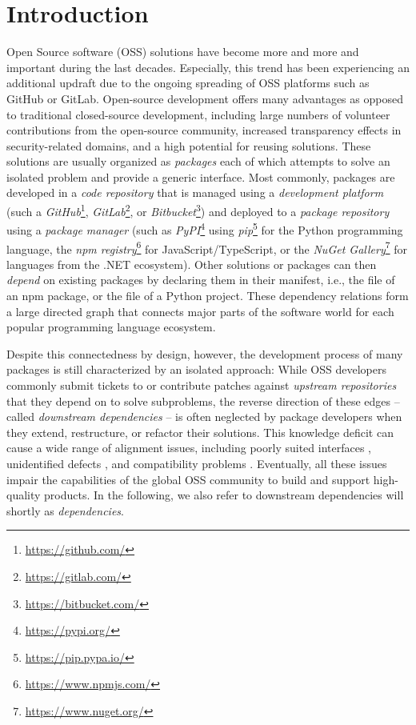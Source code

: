 \section{Introduction}
\label{sec:introduction}

Open Source software (OSS) solutions have become more and more and important during the last decades.
Especially, this trend has been experiencing an additional updraft due to the ongoing spreading of OSS platforms such as GitHub or GitLab.
Open-source development offers many advantages as opposed to traditional closed-source development, including large numbers of volunteer contributions from the open-source community, increased transparency effects in security-related domains, and a high potential for reusing solutions.
These solutions are usually organized as \emph{packages} each of which attempts to solve an isolated problem and provide a generic interface.
Most commonly, packages are developed in a \emph{code repository} that is managed using a \emph{development platform} (such a \emph{GitHub}\footnote{\url{https://github.com/}}, \emph{GitLab}\footnote{\url{https://gitlab.com/}}, or \emph{Bitbucket}\footnote{\url{https://bitbucket.com/}}) and deployed to a \emph{package repository} using a \emph{package manager} (such as \emph{PyPI}\footnote{\url{https://pypi.org/}} using \emph{pip}\footnote{\url{https://pip.pypa.io/}} for the Python programming language, the \emph{npm registry}\footnote{\url{https://www.npmjs.com/}} for JavaScript/TypeScript, or the \emph{NuGet Gallery}\footnote{\url{https://www.nuget.org/}} for languages from the .NET ecosystem).
Other solutions or packages can then \emph{depend} on existing packages by declaring them in their manifest, i.e., the  file of an npm package, or the  file of a Python project.
These dependency relations form a large directed graph that connects major parts of the software world for each popular programming language ecosystem.

Despite this connectedness by design, however, the development process of many packages is still characterized by an isolated approach:
While OSS developers commonly submit tickets to or contribute patches against \emph{upstream repositories} that they depend on to solve subproblems, the reverse direction of these edges -- called \emph{downstream dependencies} -- is often neglected by package developers when they extend, restructure, or refactor their solutions.
This knowledge deficit can cause a wide range of alignment issues, including poorly suited interfaces \citep{piccioni2013empirical}, unidentified defects \citep{wong2017more}, and compatibility problems \citep{bogart2015breaks}.
Eventually, all these issues impair the capabilities of the global OSS community to build and support high-quality products.
In the following, we also refer to downstream dependencies will shortly as \emph{dependencies}.

